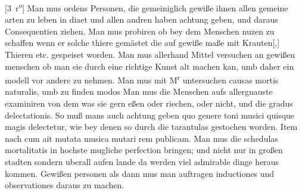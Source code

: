 [3~r\textsuperscript{o}]%
\pend%
\pstart%
Man mus
ordens Personen, die gemeiniglich gewi{\ss}e ihnen allen gemeine arten zu leben in diaet\protect{}
und allen andren haben achtung geben, und daraus Consequentien ziehen.
\pend%
\pstart%
Man mus probiren ob bey dem Menschen nuzen zu schaffen wenn er solche thiere gem\"{a}stet die auf gewi{\ss}e ma{\ss}e mit Krauten[,] Thieren etc. gespeiset worden.
\pend%
\pstart%
Man mus allerhand Mittel versuchen an gewi{\ss}en menschen ob man sie durch eine richtige Kunst alt machen kan, umb daher ein modell vor andere zu nehmen.
\pend%
\pstart%
Man mus mit M\textsuperscript{r}
%
%
untersuchen causas mortis naturalis\protect{}, umb zu finden modos
%
\pend%
\pstart%
Man mus die Menschen aufs allergnauste examiniren von dem was sie gern e{\ss}en oder riechen, oder nicht, und die gradus delectationis\protect{}.
So mu{\ss} mans auch achtung geben quo genere toni musici quisque magis delectetur, wie bey denen so durch die tarantulas\protect{} gestochen worden.
Item nach
%
cum ait mutata musica mutari rem publicam.
\pend%
\pstart%
Man mus die schedulas mortalitatis\protect{} in hochste mugliche perfection bringen; und nicht nur in gro{\ss}en stadten sondern uberall aufen lande
da werden viel admirable dinge heraus kommen. Gewi{\ss}en personen als dann mus man auftragen inductiones und observationes daraus zu machen.
